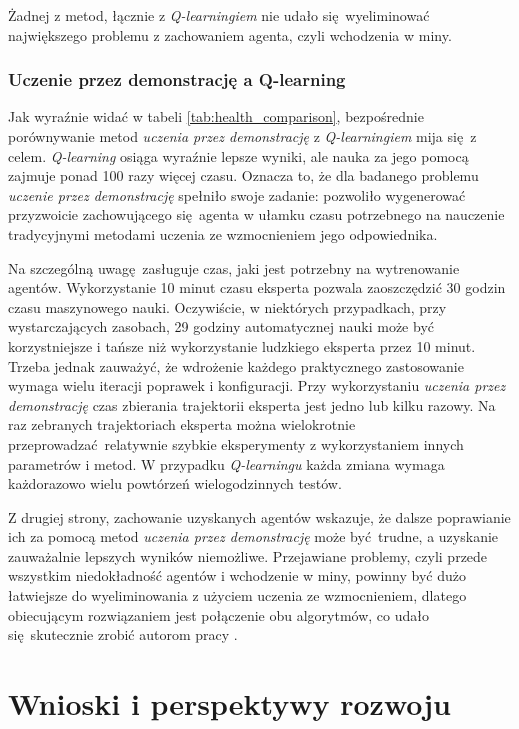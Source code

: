 \documentclass[polish,master,a4paper,oneside]{ppfcmthesis}
\begin{document}
Żadnej z metod, łącznie z \textit{Q-learningiem} nie udało się wyeliminować największego problemu z zachowaniem agenta, czyli wchodzenia w miny.

\subsection{Uczenie przez demonstrację a Q-learning}

Jak wyraźnie widać w tabeli \ref{tab:health_comparison}, bezpośrednie porównywanie metod \textit{uczenia przez demonstrację} z \textit{Q-learningiem} mija się z celem. \textit{Q-learning} osiąga wyraźnie lepsze wyniki, ale nauka za jego pomocą zajmuje ponad 100 razy więcej czasu. Oznacza to, że dla badanego problemu \textit{uczenie przez demonstrację} spełniło swoje zadanie: pozwoliło wygenerować przyzwoicie zachowującego się agenta w ułamku czasu potrzebnego na nauczenie tradycyjnymi metodami uczenia ze wzmocnieniem jego odpowiednika.

Na szczególną uwagę zasługuje czas, jaki jest potrzebny na wytrenowanie agentów. Wykorzystanie 10 minut czasu eksperta pozwala zaoszczędzić 30 godzin czasu maszynowego nauki. Oczywiście, w niektórych przypadkach, przy wystarczających zasobach, 29 godziny automatycznej nauki może być korzystniejsze i tańsze niż wykorzystanie ludzkiego eksperta przez 10 minut. Trzeba jednak zauważyć, że wdrożenie każdego praktycznego zastosowanie wymaga wielu iteracji poprawek i konfiguracji. Przy wykorzystaniu \textit{uczenia przez demonstrację} czas zbierania trajektorii eksperta jest jedno lub kilku razowy. Na raz zebranych trajektoriach eksperta można wielokrotnie przeprowadzać relatywnie szybkie eksperymenty z wykorzystaniem innych parametrów i metod. W przypadku \textit{Q-learningu} każda zmiana wymaga każdorazowo wielu powtórzeń wielogodzinnych testów.

Z drugiej strony, zachowanie uzyskanych agentów wskazuje, że dalsze poprawianie ich za pomocą metod \textit{uczenia przez demonstrację} może być trudne, a uzyskanie zauważalnie lepszych wyników niemożliwe. Przejawiane problemy, czyli przede wszystkim niedokładność agentów i wchodzenie w miny, powinny być dużo łatwiejsze do wyeliminowania z użyciem uczenia ze wzmocnieniem, dlatego obiecującym rozwiązaniem jest połączenie obu algorytmów, co udało się skutecznie zrobić autorom pracy \cite{DBLP:journals/corr/HesterVPLSPSDOA17}.


  \chapter{Wnioski i perspektywy rozwoju}
\end{document}
